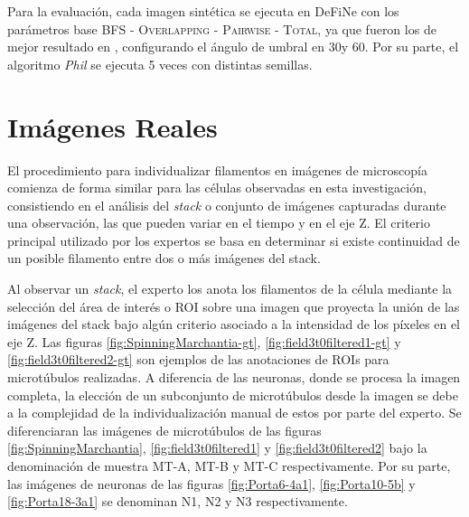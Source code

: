 Para la evaluaci\'on, cada imagen sint\'etica se ejecuta en DeFiNe con los par\'ametros base \textsc{BFS - Overlapping - Pairwise - Total}, ya que fueron los de mejor resultado en \cite{breuer2015define}, configurando el \'angulo de umbral en 30\textdegree y 60\textdegree. Por su parte, el algoritmo {\it Phil} se ejecuta 5 veces con distintas semillas.

\section{Im\'agenes Reales}
El procedimiento para individualizar filamentos en im\'agenes de microscop\'ia
comienza de forma similar para las c\'elulas observadas en esta investigaci\'on, consistiendo en el an\'alisis del {\it stack} o conjunto de im\'agenes capturadas durante una observaci\'on, las que pueden variar en el tiempo y en el eje Z. El criterio principal utilizado por los expertos se basa en determinar si existe continuidad de un posible filamento entre dos o m\'as im\'agenes del stack. %

Al observar un {\it stack}, el experto los anota los filamentos de la c\'elula mediante la selecci\'on del \'area de inter\'es o ROI sobre una imagen que proyecta la uni\'on de las im\'agenes del stack bajo alg\'un criterio asociado a la intensidad de los p\'ixeles en el eje Z. Las figuras \ref{fig:SpinningMarchantia-gt}, \ref{fig:field3t0filtered1-gt} y \ref{fig:field3t0filtered2-gt} son ejemplos de las anotaciones de ROIs para microt\'ubulos realizadas. A diferencia de las neuronas, donde se procesa la imagen completa, la elecci\'on de un subconjunto de microt\'ubulos desde la imagen se debe a la complejidad de la individualizaci\'on manual de estos por parte del experto. Se diferenciaran las im\'agenes de microt\'ubulos de las figuras \ref{fig:SpinningMarchantia}, \ref{fig:field3t0filtered1} y \ref{fig:field3t0filtered2} bajo la denominaci\'on de muestra MT-A, MT-B y MT-C respectivamente. Por su parte, las im\'agenes de neuronas de las figuras \ref{fig:Porta6-4a1}, \ref{fig:Porta10-5b} y \ref{fig:Porta18-3a1}  se denominan N1, N2 y N3 respectivamente.

